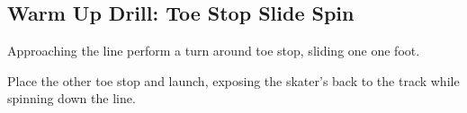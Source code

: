 \subsection*{Warm Up Drill: Toe Stop Slide Spin}
\label{drill:toe_stops/warm_up/slide_spin}

Approaching the line perform a turn around toe stop, sliding one one foot.

Place the other toe stop and launch, exposing the skater's back to the track while spinning down the line. 

